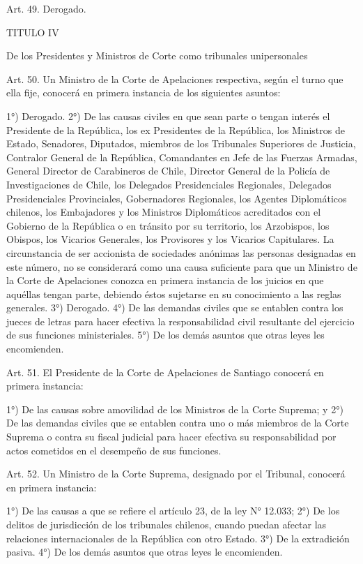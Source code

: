     Art. 49. Derogado.


    TITULO IV

    De los Presidentes y Ministros de Corte como tribunales unipersonales


    Art. 50. Un Ministro de la Corte de Apelaciones respectiva, según el turno que ella fije, conocerá en primera instancia de los siguientes asuntos:

    1°) Derogado.
    2°) De las causas civiles en que sean parte o tengan interés el Presidente de la República, los ex Presidentes de la República, los Ministros de Estado, Senadores, Diputados, miembros de los Tribunales Superiores de Justicia, Contralor General de la República, Comandantes en Jefe de las Fuerzas Armadas, General Director de Carabineros de Chile, Director General de la Policía de Investigaciones de Chile, los Delegados Presidenciales Regionales, Delegados Presidenciales Provinciales, Gobernadores Regionales, los Agentes Diplomáticos chilenos, los Embajadores y los Ministros Diplomáticos acreditados con el Gobierno de la República o en tránsito por su territorio, los Arzobispos, los Obispos, los Vicarios Generales, los Provisores y los Vicarios Capitulares.
    La circunstancia de ser accionista de sociedades anónimas las personas designadas en este número, no se considerará como una causa suficiente para que un Ministro de la Corte de Apelaciones conozca en primera instancia de los juicios en que aquéllas tengan parte, debiendo éstos sujetarse en su conocimiento a las reglas generales.
    3°) Derogado.
    4°) De las demandas civiles que se entablen contra los jueces de letras para hacer efectiva la responsabilidad civil resultante del ejercicio de sus funciones ministeriales.
    5°) De los demás asuntos que otras leyes les encomienden.



    Art. 51. El Presidente de la Corte de Apelaciones de Santiago conocerá en primera instancia:

    1°) De las causas sobre amovilidad de los Ministros de la Corte Suprema; y
    2°) De las demandas civiles que se entablen contra uno o más miembros de la Corte Suprema o contra su fiscal judicial para hacer efectiva su responsabilidad por actos cometidos en el desempeño de sus funciones.



    Art. 52. Un Ministro de la Corte Suprema, designado por el Tribunal, conocerá en primera instancia:

    1°) De las causas a que se refiere el artículo 23, de la ley N° 12.033;
    2°) De los delitos de jurisdicción de los tribunales chilenos, cuando puedan afectar las relaciones internacionales de la República con otro Estado.
    3°) De la extradición pasiva.
    4°) De los demás asuntos que otras leyes le encomienden.



